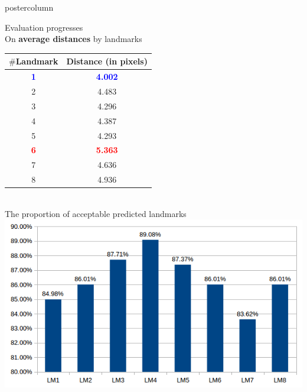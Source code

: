 \begin{frame}
\begin{columns}
\begin{column}{.49\textwidth}
\begin{beamercolorbox}[center,wd=\textwidth]{postercolumn}
\begin{minipage}[T]{.95\textwidth}
{\begin{block}{Evaluation progresses}
            ~\\[0.5cm]
            On \textbf{average distances} by landmarks
            \begin{center}
           		\begin{tabular}{|c|c|}
            		\hline
            		$\#$Landmark & Distance (in pixels)\\ \hline
            		\textbf{\textcolor{blue}{1}} & \textbf{\textcolor{blue}{4.002}} \\ \hline
            		2 & 4.483 \\ \hline
            		3 & 4.296 \\ \hline
            		4 & 4.387 \\ \hline
            		5 & 4.293 \\ \hline
            		\textbf{\textcolor{red}{6}} & \textbf{\textcolor{red}{5.363}} \\ \hline
            		7 & 4.636 \\ \hline
            		8 & 4.936 \\ \hline
            	\end{tabular}            
            \end{center}~\\[0.5cm]
            The proportion of acceptable predicted landmarks
            \includegraphics[width=.8\textwidth]{images/chart.png}
            
            \end{block}
            
            \vfill
            
}
\end{minipage}
\end{beamercolorbox}
\end{column}
\end{columns}
\end{frame}
